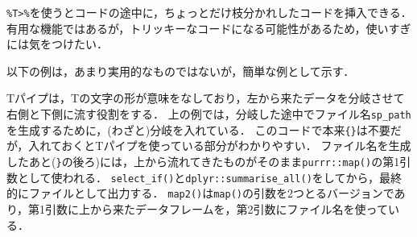 \documentclass[
]{article}
\newenvironment{Shaded}{\begin{snugshade}}{\end{snugshade}}
\newcommand{\AttributeTok}[1]{\textcolor[rgb]{0.13,0.29,0.53}{#1}}
\newcommand{\CommentTok}[1]{\textcolor[rgb]{0.56,0.35,0.01}{\textit{#1}}}
\newcommand{\DecValTok}[1]{\textcolor[rgb]{0.00,0.00,0.81}{#1}}
\newcommand{\FunctionTok}[1]{\textcolor[rgb]{0.13,0.29,0.53}{\textbf{#1}}}
\newcommand{\NormalTok}[1]{#1}
\newcommand{\OtherTok}[1]{\textcolor[rgb]{0.56,0.35,0.01}{#1}}
\newcommand{\SpecialCharTok}[1]{\textcolor[rgb]{0.81,0.36,0.00}{\textbf{#1}}}
\newcommand{\StringTok}[1]{\textcolor[rgb]{0.31,0.60,0.02}{#1}}
\begin{document}
\texttt{\%T\textgreater{}\%}を使うとコードの途中に，ちょっとだけ枝分かれしたコードを挿入できる．
有用な機能ではあるが，トリッキーなコードになる可能性があるため，使いすぎには気をつけたい．

以下の例は，あまり実用的なものではないが，簡単な例として示す．

\begin{Shaded}
\end{Shaded}

Tパイプは，Tの文字の形が意味をなしており，左から来たデータを分岐させて右側と下側に流す役割をする．
上の例では，分岐した途中でファイル名\texttt{sp\_path}を生成するために，(わざと)分岐を入れている．
このコードで本来\texttt{\{\}}は不要だが，入れておくとTパイプを使っている部分がわかりやすい．
ファイル名を生成したあと(\texttt{\}}の後ろ)には，上から流れてきたものがそのまま\texttt{purrr::map()}の第1引数として使われる．
\texttt{select\_if()}と\texttt{dplyr::summarise\_all()}をしてから，最終的にファイルとして出力する．
\texttt{map2()}は\texttt{map()}の引数を2つとるバージョンであり，第1引数に上から来たデータフレームを，第2引数にファイル名を使っている．
\end{document}
